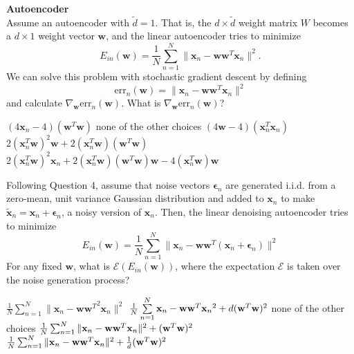 \documentclass[a4paper,10pt]{exam}
\begin{document}
\begin{questions}
		\question \textbf{Autoencoder}\\
		Assume an autoencoder with $\tilde{d} = 1$. That is, the $d \times \tilde{d}$ weight matrix $W$ becomes a $d \times 1$ weight vector $\mathbf{w}$, and the linear autoencoder tries to minimize 
		\[E_{in}(\mathbf{w}) = \frac{1}{N} \sum_{n=1}^N \|\mathbf{x}_n - \mathbf{w} \mathbf{w}^T \mathbf{x}_n\|^2.\]
		We can solve this problem with stochastic gradient descent by defining
		\[\text{err}_n(\mathbf{w}) = \|\mathbf{x}_n - \mathbf{w} \mathbf{w}^T \mathbf{x}_n\|^2\]
		and calculate $\nabla_\mathbf{w} \text{err}_n(\mathbf{w})$. What is $\nabla_\mathbf{w} \text{err}_n(\mathbf{w})$?
		\begin{checkboxes}
			\choice $(4 \mathbf{x}_n - 4) (\mathbf{w}^T \mathbf{w})$
			\choice none of the other choices
			\choice $(4 \mathbf{w} - 4) (\mathbf{x}_n^T \mathbf{x}_n)$
			\CorrectChoice $2 (\mathbf{x}_n^T \mathbf{w})^2 \mathbf{w} + 2 (\mathbf{x}_n^T \mathbf{w}) (\mathbf{w}^T \mathbf{w})$
			\choice $2 (\mathbf{x}_n^T \mathbf{w})^2 \mathbf{x}_n + 2 (\mathbf{x}_n^T \mathbf{w}) (\mathbf{w}^T \mathbf{w}) \mathbf{w} - 4 (\mathbf{x}_n^T \mathbf{w}) \mathbf{w}$\\
		\end{checkboxes}
		
		\question Following Question 4, assume that noise vectors ${\boldsymbol\epsilon}_n$ are generated i.i.d. from a zero-mean, unit variance Gaussian distribution and added to $\mathbf{x}_n$ to make $\tilde{\mathbf{x}}_n = \mathbf{x}_n + {\boldsymbol\epsilon}_n$, a noisy version of $\mathbf{x}_n$. Then, the linear denoising autoencoder tries to minimize
		\[E_{in}(\mathbf{w}) = \frac{1}{N} \sum_{n=1}^N \|\mathbf{x}_n - \mathbf{w} \mathbf{w}^T (\mathbf{x}_n + {\boldsymbol\epsilon}_n)\| ^2\]
		For any fixed $\mathbf{w}$, what is $\mathcal{E}\left(E_{in}(\mathbf{w})\right)$, where the expectation $\mathcal{E}$ is taken over the noise generation process?
		\begin{checkboxes}
			\choice $\frac{1}{N} \sum_{n=1}^N \|\mathbf{x}_n - {\mathbf{w} \mathbf{w}^T}^2 \mathbf{x}_n\|^2$
			\choice $\frac{1}{N}\sum\limits_{n = 1}^N {{{\bf{x}}_n} - {\bf{w}}{{\bf{w}}^T}{{\bf{x}}_n}{^2}}  + d{({{\bf{w}}^T}{\bf{w}})^2}$
			\choice none of the other choices
			\CorrectChoice $\frac{1}{N} \sum_{n=1}^N \|\mathbf{x}_n - \mathbf{w} \mathbf{w}^T \mathbf{x}_n\|^2 + {({{\bf{w}}^T}{\bf{w}})^2}$
			\choice $\frac{1}{N} \sum_{n=1}^N \|\mathbf{x}_n - \mathbf{w} \mathbf{w}^T \mathbf{x}_n\|^2 + \frac{1}{d} {({{\bf{w}}^T}{\bf{w}})^2}$\\
		\end{checkboxes}
		

\end{questions}
\end{document}
